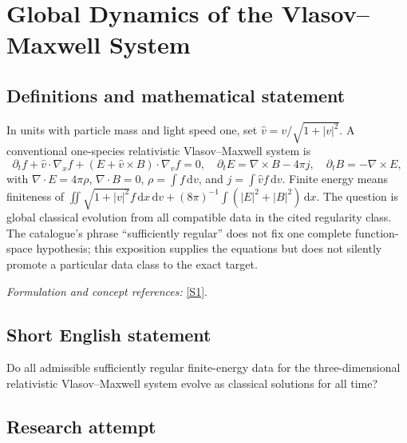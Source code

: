 \documentclass[11pt,a4paper]{article}
\newcommand{\dd}{\,\mathrm d}
\newcommand{\sref}[2]{\hyperlink{source:#1:#2}{[S#2]}}
\newif\ifshowcatalogue
\newcommand{\cataloguescope}[1]{\ifshowcatalogue
 \paragraph{Exact scope in the supplied catalogue.}
 \begin{quote}\small #1\end{quote}\fi}
\begin{document}
\setcounter{section}{0}
\clearpage
\section*{\texorpdfstring{Global Dynamics of the Vlasov–Maxwell System}{Global Dynamics of the Vlasov–Maxwell System}}\label{statement}
\subsection{Definitions and mathematical statement}
In units with particle mass and light speed one, set $\widehat v=v/\sqrt{1+|v|^2}$. A conventional one-species relativistic Vlasov--Maxwell system is
\[
 \partial_tf+\widehat v\cdot\nabla_xf+(E+\widehat v\times B)\cdot\nabla_vf=0,
 \quad \partial_tE=\nabla\times B-4\pi j,\quad\partial_tB=-\nabla\times E,
\]
with $\nabla\cdot E=4\pi\rho$, $\nabla\cdot B=0$, $\rho=\int f\dd v$, and $j=\int\widehat v f\dd v$. Finite energy means finiteness of
$\iint\sqrt{1+|v|^2}f\dd x\dd v+(8\pi)^{-1}\int(|E|^2+|B|^2)\dd x$.
The question is global classical evolution from all compatible data in the cited regularity class. The catalogue's phrase ``sufficiently regular'' does not fix one complete function-space hypothesis; this exposition supplies the equations but does not silently promote a particular data class to the exact target.
\par\smallskip\textit{Formulation and concept references:} \sref{statement}{1}.
\cataloguescope{Prove or disprove that the Cauchy problem for the three-dimensional relativistic Vlasov-Maxwell system has a global classical solution (f,E,B) for every sufficiently regular finite-energy initial datum.}
\subsection{Short English statement}
Do all admissible sufficiently regular finite-energy data for the three-dimensional relativistic Vlasov–Maxwell system evolve as classical solutions for all time?
\subsection{Research attempt}
\end{document}

